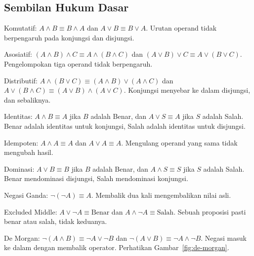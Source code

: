 \documentclass[11pt,a4paper]{article}
\begin{document}
\subsection{Sembilan Hukum Dasar}

Komutatif: $A \wedge B \equiv B \wedge A$ dan $A \vee B \equiv B \vee A$. Urutan operand tidak berpengaruh pada konjungsi dan disjungsi.

Asosiatif: $(A \wedge B) \wedge C \equiv A \wedge (B \wedge C)$ dan $(A \vee B) \vee C \equiv A \vee (B \vee C)$. Pengelompokan tiga operand tidak berpengaruh.

Distributif: $A \wedge (B \vee C) \equiv (A \wedge B) \vee (A \wedge C)$ dan $A \vee (B \wedge C) \equiv (A \vee B) \wedge (A \vee C)$. Konjungsi menyebar ke dalam disjungsi, dan sebaliknya.

Identitas: $A \wedge B \equiv A$ jika $B$ adalah Benar, dan $A \vee S \equiv A$ jika $S$ adalah Salah. Benar adalah identitas untuk konjungsi, Salah adalah identitas untuk disjungsi.

Idempoten: $A \wedge A \equiv A$ dan $A \vee A \equiv A$. Mengulang operand yang sama tidak mengubah hasil.

Dominasi: $A \vee B \equiv B$ jika $B$ adalah Benar, dan $A \wedge S \equiv S$ jika $S$ adalah Salah. Benar mendominasi disjungsi, Salah mendominasi konjungsi.

Negasi Ganda: $\neg(\neg A) \equiv A$. Membalik dua kali mengembalikan nilai asli.

Excluded Middle: $A \vee \neg A \equiv \text{Benar}$ dan $A \wedge \neg A \equiv \text{Salah}$. Sebuah proposisi pasti benar atau salah, tidak keduanya.

De Morgan: $\neg(A \wedge B) \equiv \neg A \vee \neg B$ dan $\neg(A \vee B) \equiv \neg A \wedge \neg B$. Negasi masuk ke dalam dengan membalik operator. Perhatikan Gambar~\ref{fig:de-morgan}.
\end{document}
